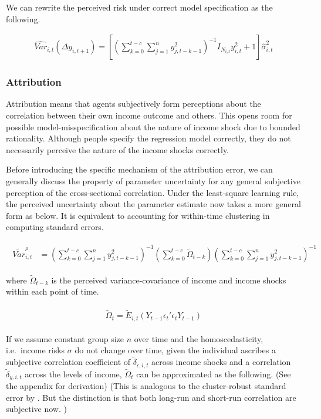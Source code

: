 \documentclass[12pt,notitlepage,onecolumn,aps,pra]{article}
\begin{document}
We can rewrite the perceived risk under correct model specification as
the following.

\begin{eqnarray}
\widehat{Var}_{i,t}(\Delta y_{i,t+1}) = [(\sum^{t-c}_{k=0}\sum^{n}_{j=1}y^2_{j,t-k-1})^{-1}I_{N_{i,t}}y^2_{i,t} + 1] \hat{\sigma}^2_{i,t}
\end{eqnarray}

    \hypertarget{attribution}{%
\subsubsection{Attribution}\label{attribution}}

Attribution means that agents subjectively form perceptions about the
correlation between their own income outcome and others. This opens room
for possible model-misspecification about the nature of income shock due
to bounded rationality. Although people specify the regression model
correctly, they do not necessarily perceive the nature of the income
shocks correctly.

Before introducing the specific mechanism of the attribution error, we
can generally discuss the property of parameter uncertainty for any
general subjective perception of the cross-sectional correlation. Under
the least-square learning rule, the perceived uncertainty about the
parameter estimate now takes a more general form as below. It is
equivalent to accounting for within-time clustering in computing
standard errors.

\begin{eqnarray}
\begin{split}
\tilde {Var}^{\rho}_{i,t} & =   (\sum^{t-c}_{k=0}\sum^{n}_{j=1}y^2_{j,t-k-1})^{-1}(\sum^{t-c}_{k=0}\tilde \Omega_{t-k})(\sum^{t-c}_{k=0}\sum^{n}_{j=1}y^2_{j,t-k-1})^{-1}
\end{split}
\end{eqnarray}

where \(\tilde \Omega_{t-k}\) is the perceived variance-covariance of
income and income shocks within each point of time.

\begin{eqnarray}
\begin{split}
\tilde \Omega_{t} = \tilde E_{i,t}(Y_{t-1}\epsilon_{t}'\epsilon_{t}Y_{t-1})
\end{split}
\end{eqnarray}

If we assume constant group size \(n\) over time and the
homoscedasticity, i.e.~income risks \(\sigma\) do not change over time,
given the individual ascribes a subjective correlation coefficient of
\(\tilde \delta_{\epsilon, i,t}\) across income shocks and a correlation
\(\tilde \delta_{y, i,t}\) across the levels of income,
\(\tilde \Omega_{t}\) can be approximated as the following. (See the
appendix for derivation) (This is analogous to the cluster-robust
standard error by \cite{cameron2011robust}. But the distinction is that
both long-run and short-run correlation are subjective now. )
\end{document}
